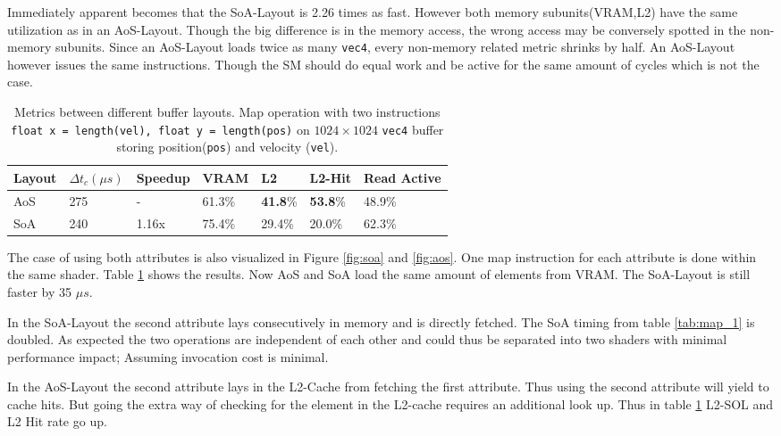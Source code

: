 \documentclass[m,times]{cgMA}
\begin{document}
Immediately apparent becomes that the SoA-Layout is 2.26 times as fast. However both memory subunits(VRAM,L2) have the same utilization as in an AoS-Layout. Though the big difference is in the memory access, the wrong access may be conversely spotted in the non-memory subunits. Since an AoS-Layout loads twice as many \texttt{vec4}, every non-memory related metric shrinks by half. An AoS-Layout however issues the same instructions. Though the SM should do equal work and be active for the same amount of cycles which is not the case.
\begin{table}[htpb]
  \begin{tabular}{ | l | l | l | l | l | l | l |}    \hline
    Layout &  $\Delta t_c (\mu s)$ & Speedup       &VRAM             & L2              & L2-Hit & Read Active \\\hline
    AoS         & 275                   & -        &61.3\%           & \textbf{41.8}\% & \textbf{53.8}\% & 48.9\% \\\hline
    SoA         & 240                   & 1.16x    &75.4\%  & 29.4\%          & 20.0\% & 62.3\% \\
    \hline
  \end{tabular}
\caption{Metrics between different buffer layouts. Map operation with two instructions \texttt{float x = length(vel), float y = length(pos)} on $1024 \times 1024$ \texttt{vec4} buffer storing position(\texttt{pos}) and velocity (\texttt{vel}).}
\label{tab:map_2}
\end{table}

The case of using both attributes is also visualized in Figure \ref{fig:soa} and \ref{fig:aos}. One map instruction for each attribute is done within the same shader. Table \ref{tab:map_2} shows the results. Now AoS and SoA load the same amount of elements from VRAM. The SoA-Layout is still faster by 35 $\mu s$.

In the SoA-Layout the second attribute lays consecutively in memory and is directly fetched. The SoA timing from table \ref{tab:map_1} is doubled. As expected the two operations are independent of each other and could thus be separated into two shaders with minimal performance impact; Assuming invocation cost is minimal.

In the AoS-Layout the second attribute lays in the L2-Cache from fetching the first attribute. Thus using the second attribute will yield to cache hits. But going the extra way of checking for the element in the L2-cache requires an additional look up. Thus in table \ref{tab:map_2} L2-SOL and L2 Hit rate go up.
\end{document}
